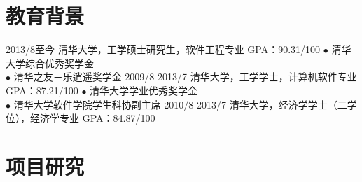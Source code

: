 \documentclass[]{friggeri-cv-cn}
\begin{document}


\section{教育背景}

\begin{entrylist}
  \entry
    {2013/8至今}
    {清华大学，工学硕士研究生，软件工程专业}
    {GPA：90.31/100}
    {
    $\bullet$ 清华大学综合优秀奖学金 \\
    $\bullet$ 清华之友－乐逍遥奖学金
    }
  \entry
    {2009/8-2013/7}
    {清华大学，工学学士，计算机软件专业}
    {GPA：87.21/100}
    {
    $\bullet$ 清华大学学业优秀奖学金\\
    $\bullet$ 清华大学软件学院学生科协副主席
    }
  \entrya
    {2010/8-2013/7}
    {清华大学，经济学学士（二学位），经济学专业}
    {GPA：84.87/100}
\end{entrylist}

\section{项目研究}
\end{document}
